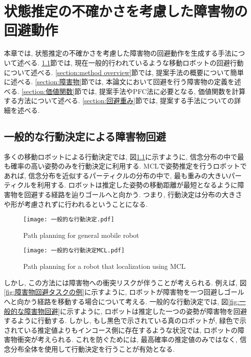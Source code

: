 \chapter{状態推定の不確かさを考慮した障害物の回避動作} \label{chapter:method}
本章では, 状態推定の不確かさを考慮した障害物の回避動作を生成する手法について述べる. 
\ref{section:一般的な回避}節では, 現在一般的行われているような移動ロボットの回避行動について述べる. 
\ref{section:method overview}節では, 提案手法の概要について簡単に述べる. 
\ref{section:障害物}節では, 本論文において回避を行う障害物の定義を述べる. 
\ref{section:価値関数}節では, 提案手法やPFC法に必要となる, 価値関数を計算する方法について述べる. 
\ref{section:回避重み}節では, 提案する手法についての詳細を述べる. 


\section{一般的な行動決定による障害物回避} \label{section:一般的な回避}
多くの移動ロボットによる行動決定では, 図\ref{fig:一般的な行動決定}に示すように, 
信念分布の中で最も確率の高い姿勢のみを行動決定に利用する. 
MCLで姿勢推定を行うロボットであれば, 信念分布を近似するパーティクルの分布の中で, 
最も重みの大きいパーティクルを利用する. 
ロボットは推定した姿勢の移動距離が最短となるように障害物を回避する経路を辿りゴールへと向かう. 
つまり, 行動決定は分布の大きさや形が考慮されずに行われるということになる. 

\begin{figure}[H]
  \begin{center}
    \texttt{[image: 一般的な行動決定.pdf]}
    \caption{Path planning for general mobile robot}
    \label{fig:一般的な行動決定}
  \end{center}
\end{figure}

\begin{figure}[H]
  \begin{center}
    \texttt{[image: 一般的な行動決定MCL.pdf]}
    \caption{Path planning for a robot that localization using MCL}
    \label{fig:一般的な行動決定MCL}
  \end{center}
\end{figure}

しかし, この方法には障害物への衝突リスクが伴うことが考えられる. 
例えば, 図\ref{fig:障害物回避タスクの例}に示すように, 
ロボットが障害物を一つ回避しゴールへと向かう経路を移動する場合について考える. 
一般的な行動決定では, 図\ref{fig:一般的な障害物回避}に示すように, ロボットは推定した一つの姿勢が障害物を回避するように行動する. 
しかし, もし黒色で示されている真のロボットが, 緑色で示されている推定値よりもインコース側に存在するような状況では, 
ロボットの障害物衝突が考えられる. 
これを防ぐためには, 最高確率の推定値のみではなく, 信念分布全体を使用して行動決定を行うことが有効となる. 

